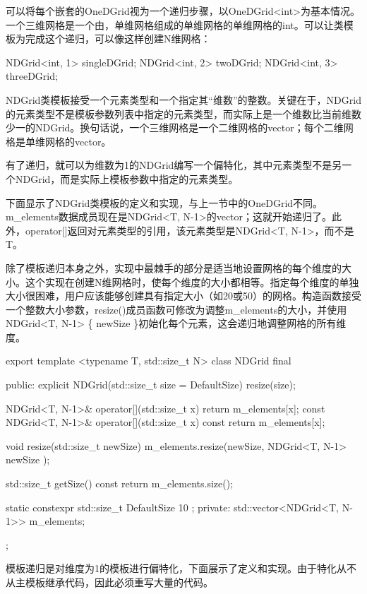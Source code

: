 可以将每个嵌套的OneDGrid视为一个递归步骤，以OneDGrid<int>为基本情况。一个三维网格是一个由，单维网格组成的单维网格的单维网格的int。可以让类模板为完成这个递归，可以像这样创建N维网格：

\begin{cpp}
NDGrid<int, 1> singleDGrid;
NDGrid<int, 2> twoDGrid;
NDGrid<int, 3> threeDGrid;
\end{cpp}

NDGrid类模板接受一个元素类型和一个指定其“维数”的整数。关键在于，NDGrid的元素类型不是模板参数列表中指定的元素类型，而实际上是一个维数比当前维数少一的NDGrid。换句话说，一个三维网格是一个二维网格的vector；每个二维网格是单维网格的vector。

有了递归，就可以为维数为1的NDGrid编写一个偏特化，其中元素类型不是另一个NDGrid，而是实际上模板参数中指定的元素类型。

下面显示了NDGrid类模板的定义和实现，与上一节中的OneDGrid不同。m\_elements数据成员现在是NDGrid<T, N-1>的vector；这就开始递归了。此外，operator[]返回对元素类型的引用，该元素类型是NDGrid<T, N-1>，而不是T。

除了模板递归本身之外，实现中最棘手的部分是适当地设置网格的每个维度的大小。这个实现在创建N维网格时，使每个维度的大小都相等。指定每个维度的单独大小很困难，用户应该能够创建具有指定大小（如20或50）的网格。构造函数接受一个整数大小参数，resize()成员函数可修改为调整m\_elements的大小，并使用NDGrid<T, N-1> \{ newSize \}初始化每个元素，这会递归地调整网格的所有维度。

\begin{cpp}
export template <typename T, std::size_t N>
class NDGrid final
{
    public:
        explicit NDGrid(std::size_t size = DefaultSize) { resize(size); }

        NDGrid<T, N-1>& operator[](std::size_t x) { return m_elements[x]; }
        const NDGrid<T, N-1>& operator[](std::size_t x) const {
            return m_elements[x]; }

        void resize(std::size_t newSize)
        {
            m_elements.resize(newSize, NDGrid<T, N-1> { newSize });
        }

        std::size_t getSize() const { return m_elements.size(); }

        static constexpr std::size_t DefaultSize { 10 };
    private:
        std::vector<NDGrid<T, N-1>> m_elements;
};
\end{cpp}

模板递归是对维度为1的模板进行偏特化，下面展示了定义和实现。由于特化从不从主模板继承代码，因此必须重写大量的代码。

